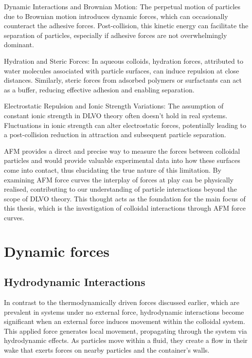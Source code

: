Dynamic Interactions and Brownian Motion: The perpetual motion of particles due to Brownian motion introduces dynamic forces, which can occasionally counteract the adhesive forces. Post-collision, this kinetic energy can facilitate the separation of particles, especially if adhesive forces are not overwhelmingly dominant.

Hydration and Steric Forces: In aqueous colloids, hydration forces, attributed to water molecules associated with particle surfaces, can induce repulsion at close distances. Similarly, steric forces from adsorbed polymers or surfactants can act as a buffer, reducing effective adhesion and enabling separation.

Electrostatic Repulsion and Ionic Strength Variations: The assumption of constant ionic strength in DLVO theory often doesn't hold in real systems. Fluctuations in ionic strength can alter electrostatic forces, potentially leading to a post-collision reduction in attraction and subsequent particle separation.

 AFM provides a direct and precise way to measure the forces between colloidal particles and would provide valuable experimental data into how these surfaces come into contact, thus elucidating the true nature of this limitation. By examining AFM force curves the interplay of forces at play can be physically realised, contributing to our understanding of particle interactions beyond the scope of DLVO theory. This thought acts as the foundation for the main focus of this thesis, which is the investigation of colloidal interactions through AFM force curves. \cite{ducker1994hydrophobic} \cite{antonyuk2019particles} \cite{israelachvili2011intermolecular}


\section{Dynamic forces}

\subsection{Hydrodynamic Interactions}

In contrast to the thermodynamically driven forces discussed earlier, which are prevalent in systems under no external force, hydrodynamic interactions become significant when an external force induces movement within the colloidal system. This applied force generates local movement, propagating through the system via hydrodynamic effects. As particles move within a fluid, they create a flow in their wake that exerts forces on nearby particles and the container's walls.

